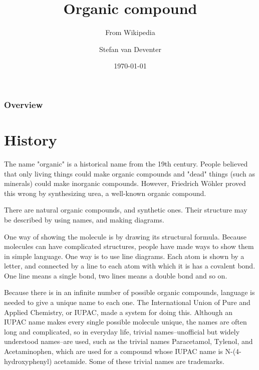 \documentclass{beamer}
\title{Organic compound}
\subtitle{From Wikipedia}
\author{Stefan van Deventer}
\institute{University of Stellenbosch}
\date{\today}
\begin{document}
\begin{frame}
	\titlepage
\end{frame}

\begin{frame}
	\frametitle{Overview}
	\tableofcontents
\end{frame}


\section{History}
\begin{frame}
	The name "organic" is a historical name from the 19th century.
	\newline
	\newline
	People believed that only living things could make organic compounds and "dead" things (such as minerals) 
	could make inorganic compounds. However, Friedrich Wöhler proved this wrong by synthesizing urea, a well-known 
	organic compound.
\end{frame}
\begin{frame}
	There are natural organic compounds, and synthetic ones. Their structure may be described by using names, 
	and making diagrams.
	\begin{block}
		One way of showing the molecule is by drawing its structural formula. Because molecules can have 
		complicated structures, people have made ways to show them in simple language. One way is to use line 
		diagrams. Each atom is shown by a letter, and connected by a line to each atom with which it is has a 
		covalent bond. One line means a single bond, two lines means a double bond and so on.
	\end{block}
	Because there is in an infinite number of possible organic compounds, language is needed to give a 
	unique name to each one. The International Union of Pure and Applied Chemistry, or IUPAC, made a system for 
	doing this.\vline
	Although an IUPAC name makes every single possible molecule unique, the names are often long and complicated, 
	so in everyday life, trivial names--unofficial but widely understood names--are used, such as the trivial 
	names Paracetamol, Tylenol, and Acetaminophen, which are used for a compound whose IUPAC name is 
	N-(4-hydroxyphenyl) acetamide. Some of these trivial names are trademarks.

\end{frame}

\end{document}
